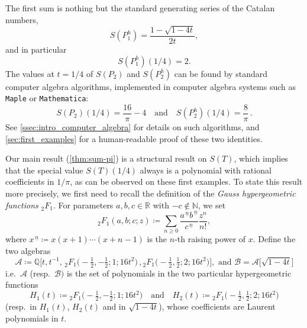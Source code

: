 \documentclass[12pt]{amsart}
\theoremstyle{plain}
\theoremstyle{remark}
\def\R{\mathbb{R}}
\def\Q{\mathbb{Q}}
\def\Q{\mathbb{Q}}
\def\cA{\mathcal{A}}
\def\cB{\mathcal{B}}
\begin{document}
The first sum is nothing but the standard generating series of the Catalan numbers,
\[S(P_1^h) =\frac{1-\sqrt{1-4t}}{2t},\]
and in particular 
\[S(P_1^h)(1/4)=2.\]
 The values at $t=1/4$ of $S(P_2)$ and $S(P^h_2)$ can be found by standard computer algebra 
algorithms, implemented in computer algebra systems such as \texttt{Maple} or \texttt{Mathematica}: \[ S(P_2)(1/4)=\frac{16}{\pi}-4 \quad \text{and}  \quad S(P_2^h)(1/4)=\frac{8}{\pi} \, .\]
See \cref{ssec:intro_computer_algebra} for details on such algorithms, and  \cref{sec:first_examples} for a human-readable proof of these two identities.

Our main result (\cref{thm:sum-pi}) is a structural result on $S(T)$, which implies that the special value $S(T)(1/4)$
always is a polynomial with rational coefficients in $1/\pi$, as can be observed on these first examples.
To state this result more precisely, we first need to recall 
the definition of the {\em Gauss hypergeometric functions} ${}_{2}^{}{{}{{}{F_{1}^{}}}}$.
For parameters $a,b,c \in \R$ with $-c \notin \mathbb{N}$, we set
\begin{equation}\label{eq:def_hyper}
  {}_{2}^{}{{}{{}{F_{1}^{}}}}(a,b;c;z)\coloneqq  \sum_{n \ge 0} \frac{a^{\, \underline n} b^{\, \underline n}}{c^{\, \underline n}} \frac{z^n}{n!},
\end{equation} 
where $x^{\, \underline n}\coloneqq x(x+1) \cdots (x+n-1)$ is the $n$-th raising power of $x$. 
Define the two algebras
\[
\cA \coloneqq  \Q\Big[t,t^{-1}, \, {}_{2}^{}{{}{{}{F_{1}^{}}}}\big(-\tfrac12,-\tfrac12; 1;16t^2\big)\, , {}_{2}^{}{{}{{}{F_{1}^{}}}}\big(-\tfrac12,\tfrac12; 2;16t^2\big) \Big], \text{ and }\cB=\cA \big[\sqrt{1-4t}\big]
\]
i.e.~$\cA$ (resp.~$\cB)$ is the set of polynomials in the two particular hypergeometric functions
\[
H_1(t) \coloneqq {}_{2}^{}{{}{{}{F_{1}^{}}}}\big(-\tfrac12,-\tfrac12; 1;16t^2\big)
\quad \text{and} \quad
H_2(t) \coloneqq {}_{2}^{}{{}{{}{F_{1}^{}}}}\big(-\tfrac12,\tfrac12; 2;16t^2\big)
\]
 (resp.~in $H_1(t)$, $H_2(t)$ and in $\sqrt{1-4t}$), whose coefficients are Laurent polynomials in $t$.
\end{document}
